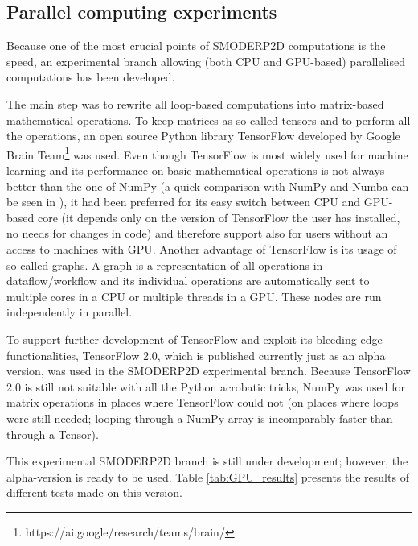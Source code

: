 \subsection{Parallel computing experiments}

Because one of the most crucial points of SMODERP2D computations is
the speed, an experimental branch allowing (both CPU and GPU-based)
parallelised computations has been developed.

The main step was to rewrite all loop-based computations into
matrix-based mathematical operations. To keep matrices as so-called
tensors and to perform all the operations, an open source Python
library TensorFlow \cite{tensorflow2015-whitepaper} developed by Google Brain
Team\footnote{https://ai.google/research/teams/brain/} was used. Even though
TensorFlow is most widely used for machine learning
and its performance on basic mathematical operations is not always better
than the one of NumPy (a quick comparison with NumPy and Numba can be
seen in \cite{tf-np}), it had been preferred for its easy switch
between CPU and GPU-based core (it depends only on the version of
TensorFlow the user has installed, no needs for changes in code) and
therefore support also for users without an access to machines with
GPU. Another advantage of TensorFlow is its usage of so-called
graphs. A graph is a representation of all operations in
dataflow/workflow and its individual operations are automatically sent
to multiple cores in a CPU or multiple threads in a GPU. These nodes
are run independently in parallel.

To support further development of TensorFlow and exploit its bleeding
edge functionalities, TensorFlow 2.0, which is published currently
just as an alpha version, was used in the SMODERP2D experimental
branch. Because TensorFlow 2.0 is still not suitable with all the
Python acrobatic tricks, NumPy was used for matrix operations in
places where TensorFlow could not (on places where loops were still
needed; looping through a NumPy array is incomparably faster than
through a Tensor).

This experimental SMODERP2D branch is still under development;
however, the alpha-version is ready to be used. Table \ref{tab:GPU_results}
presents the results of different tests made on this version.

